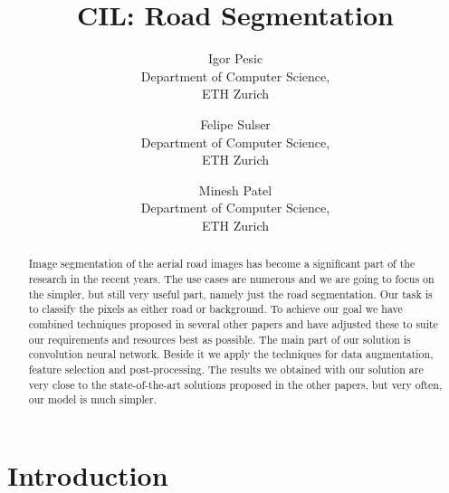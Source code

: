 \documentclass[10pt,conference,compsocconf]{IEEEtran}
\begin{document}
\title{CIL: Road Segmentation}

\author{
  Igor Pesic\\
  Department of Computer Science,\\ ETH Zurich
  \and
  Felipe Sulser\\
  Department of Computer Science,\\ ETH Zurich
  \and
  Minesh Patel\\
  Department of Computer Science,\\ ETH Zurich
}

\maketitle

\begin{abstract}
  Image segmentation of the aerial road images has become a significant part of the research in the recent years.
  The use cases are numerous and we are going to focus on the simpler, but still very useful part, namely just the road
  segmentation. Our task is to classify the pixels as either road or background. To achieve our goal we have combined
  techniques proposed in several other papers and have adjusted these to suite our requirements and resources best as possible.  
  The main part of our solution is convolution neural network. Beside it we apply the techniques for data augmentation,
  feature selection and post-processing. The results we obtained with our solution are very close to the state-of-the-art
  solutions proposed in the other papers, but very often, our model is much simpler.
\end{abstract}

\section{Introduction}
\end{document}
